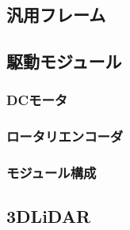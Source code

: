 \subsection{汎用フレーム}







\subsection{駆動モジュール}
\subsubsection{DCモータ}
\subsubsection{ロータリエンコーダ}
\subsubsection{モジュール構成}



\subsection{3DLiDAR}

